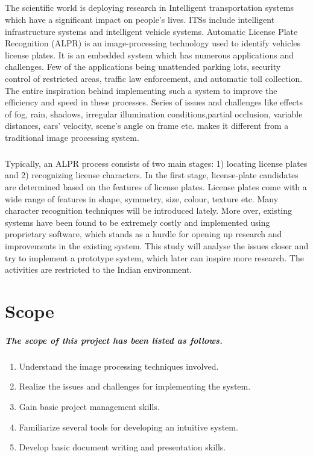 \documentclass[a4paper,10pt]{iesreport}
\begin{document}
\paragraph*{}
The scientific world is deploying research in Intelligent transportation systems which have a significant impact on people’s lives. ITSs include intelligent
 infrastructure systems and intelligent vehicle systems. Automatic License Plate Recognition (ALPR) is an image-processing
 technology used to identify vehicles license plates. It is an embedded system which has numerous applications and challenges. Few of the  applications being unattended parking lots, security control of restricted areas, traffic law enforcement, and automatic toll collection. The entire inspiration behind implementing such a system to improve the efficiency and speed in these processes. Series of issues and challenges like effects of fog, rain, shadows, irregular illumination conditions,partial occlusion, variable
 distances, cars’ velocity, scene’s angle on frame etc. makes it different from a traditional image processing system.
\paragraph*{}
Typically, an ALPR process consists of two main stages: 1) locating
 license plates and 2) recognizing license characters. In the first stage,
 license-plate candidates are determined based on the features of license
 plates. License plates come with a wide range of features in shape, symmetry, size, colour,  texture etc. Many character recognition techniques will be introduced lately. More over, existing systems have been found to be extremely costly and implemented using proprietary software, which stands as a hurdle for opening up research and improvements in the existing system. This study will analyse the issues closer and try to implement a prototype system, which later can inspire more research. The activities are restricted to the Indian environment.

\chapter{Scope}
\paragraph*{The scope of this project has been listed as follows.}
\begin{enumerate}
 \item Understand the image processing techniques involved.
 \item Realize the issues and challenges for implementing the
 system.
 \item Gain basic project management skills.
 \item Familiarize several tools for developing an intuitive system.
 \item Develop basic document writing and presentation skills.
\end{enumerate}
\end{document}
